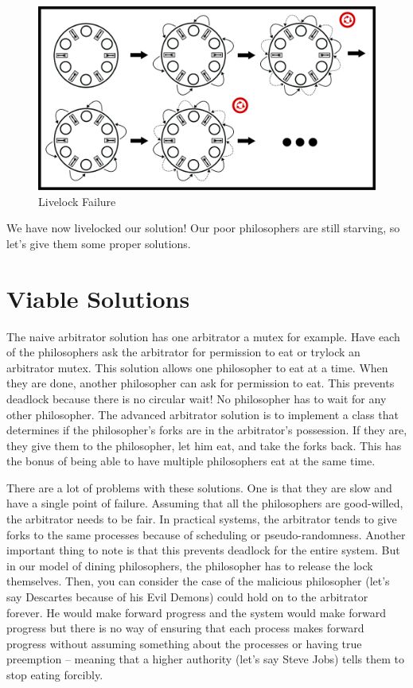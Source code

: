 \begin{figure}[H]
	\centering
	\includegraphics[width=.9\textwidth]{deadlock/drawings/dining_livelock.eps}
	\caption{Livelock Failure}
\end{figure}

We have now livelocked our solution! Our poor philosophers are still starving, so let's give them some proper solutions.

\section{Viable Solutions}

The naive arbitrator solution has one arbitrator a mutex for example.
Have each of the philosophers ask the arbitrator for permission to eat or trylock an arbitrator mutex.
This solution allows one philosopher to eat at a time.
When they are done, another philosopher can ask for permission to eat.
This prevents deadlock because there is no circular wait! No philosopher has to wait for any other philosopher.
The advanced arbitrator solution is to implement a class that determines if the philosopher's forks are in the arbitrator's possession.
If they are, they give them to the philosopher, let him eat, and take the forks back.
This has the bonus of being able to have multiple philosophers eat at the same time.

There are a lot of problems with these solutions.
One is that they are slow and have a single point of failure.
Assuming that all the philosophers are good-willed, the arbitrator needs to be fair.
In practical systems, the arbitrator tends to give forks to the same processes because of scheduling or pseudo-randomness.
Another important thing to note is that this prevents deadlock for the entire system.
But in our model of dining philosophers, the philosopher has to release the lock themselves.
Then, you can consider the case of the malicious philosopher (let's say Descartes because of his Evil Demons) could hold on to the arbitrator forever.
He would make forward progress and the system would make forward progress but there is no way of ensuring that each process makes forward progress without assuming something about the processes or having true preemption -- meaning that a higher authority (let's say Steve Jobs) tells them to stop eating forcibly.


